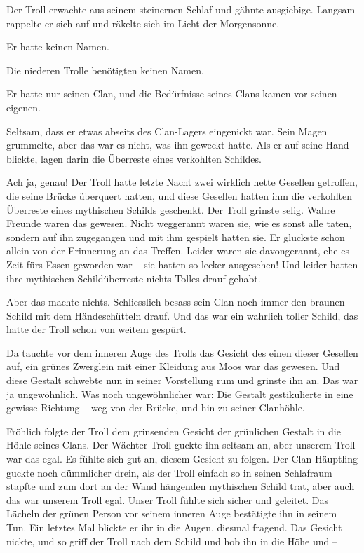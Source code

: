\trennzeichen



Der Troll erwachte aus seinem steinernen Schlaf und gähnte ausgiebige. Langsam rappelte er sich auf und räkelte sich im Licht der Morgensonne.

Er hatte keinen Namen.

Die niederen Trolle benötigten keinen Namen.

Er hatte nur seinen Clan, und die Bedürfnisse seines Clans kamen vor seinen eigenen.

Seltsam, dass er etwas abseits des Clan-Lagers eingenickt war. Sein Magen grummelte, aber das war es nicht, was ihn geweckt hatte. Als er auf seine Hand blickte, lagen darin die Überreste eines verkohlten Schildes.

Ach ja, genau! Der Troll hatte letzte Nacht zwei wirklich nette Gesellen getroffen, die seine Brücke überquert hatten, und diese Gesellen hatten ihm die verkohlten Überreste eines mythischen Schilds geschenkt. Der Troll grinste selig. Wahre Freunde waren das gewesen. Nicht weggerannt waren sie, wie es sonst alle taten, sondern auf ihn zugegangen und mit ihm gespielt hatten sie. Er gluckste schon allein von der Erinnerung an das Treffen. Leider waren sie davongerannt, ehe es Zeit fürs Essen geworden war – sie hatten so lecker ausgesehen! Und leider hatten ihre mythischen Schildüberreste nichts Tolles drauf gehabt.

Aber das machte nichts. Schliesslich besass sein Clan noch immer den braunen Schild mit dem Händeschütteln drauf. Und das war ein wahrlich toller Schild, das hatte der Troll schon von weitem gespürt.

Da tauchte vor dem inneren Auge des Trolls das Gesicht des einen dieser Gesellen auf, ein grünes Zwerglein mit einer Kleidung aus Moos war das gewesen. Und diese Gestalt schwebte nun in seiner Vorstellung rum und grinste ihn an. Das war ja ungewöhnlich. Was noch ungewöhnlicher war: Die Gestalt gestikulierte in eine gewisse Richtung – weg von der Brücke, und hin zu seiner Clanhöhle.
  
Fröhlich folgte der Troll dem grinsenden Gesicht der grünlichen Gestalt in die Höhle seines Clans. Der Wächter-Troll guckte ihn seltsam an, aber unserem Troll war das egal. Es fühlte sich gut an, diesem Gesicht zu folgen. Der Clan-Häuptling guckte noch dümmlicher drein, als der Troll einfach so in seinen Schlafraum stapfte und zum dort an der Wand hängenden mythischen Schild trat, aber auch das war unserem Troll egal. Unser Troll fühlte sich sicher und geleitet. Das Lächeln der grünen Person vor seinem inneren Auge bestätigte ihn in seinem Tun. Ein letztes Mal blickte er ihr in die Augen, diesmal fragend. Das Gesicht nickte, und so griff der Troll nach dem Schild und hob ihn in die Höhe und –

